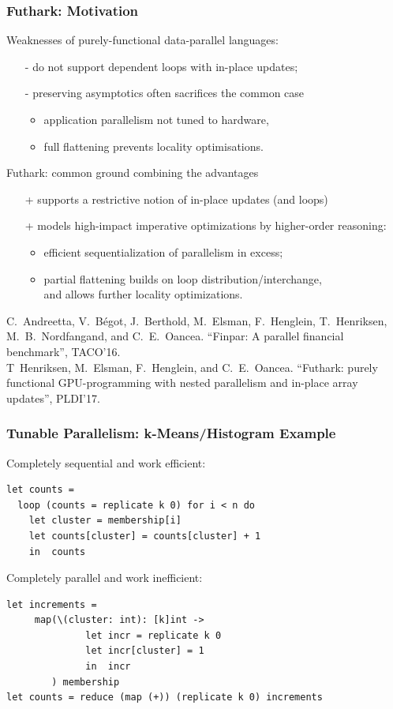 \documentclass{beamer}
\newcommand{\emp}[1]{\textcolor{DikuRed}{ #1}}
\newcommand{\emphh}[1]{\textcolor{CosGreen}{ #1}}
\begin{document}
\begin{frame}
  \frametitle{Futhark: Motivation}

\emp{Weaknesses of purely-functional data-parallel languages:}
\begin{itemize}
    \item[-] do not support dependent loops with in-place updates;
    \item[-] preserving asymptotics often sacrifices the common case 
        \begin{itemize}
            \item application parallelism not tuned to hardware,
            \item full flattening prevents locality optimisations.
        \end{itemize}
\end{itemize}
\bigskip

\emphh{Futhark: common ground combining the advantages}
\begin{itemize}
    \item[+] supports a restrictive notion of in-place updates (and loops)
    \item[+] models high-impact imperative optimizations by higher-order reasoning:
        \begin{itemize}
            \item efficient sequentialization of parallelism in excess;
            \item partial flattening builds on loop distribution/interchange,\\ 
                    and allows further locality optimizations.
        \end{itemize}
\end{itemize}
\medskip

\tiny{
C.~Andreetta, V.~Bégot, J.~Berthold, M.~Elsman, F.~Henglein, T.~Henriksen, M.~B.~Nordfangand, and C.~E.~Oancea. ``Finpar: A parallel financial benchmark'', TACO'16.\\
T~Henriksen, M.~Elsman, F.~Henglein, and C.~E.~Oancea. ``Futhark: purely functional GPU-programming with nested parallelism and in-place array updates'', PLDI'17.
}

\end{frame}


\begin{frame}[fragile,t]
  \frametitle{Tunable Parallelism: k-Means/Histogram Example}

\emp{Completely sequential} and \emphh{work efficient:}
\begin{lstlisting}
let counts = 
  loop (counts = replicate k 0) for i < n do
    let cluster = membership[i]
    let counts[cluster] = counts[cluster] + 1
    in  counts
\end{lstlisting}
\bigskip
\pause

\emphh{Completely parallel} and \emp{work inefficient:}
\begin{lstlisting}
let increments =
     map(\(cluster: int): [k]int ->
              let incr = replicate k 0
              let incr[cluster] = 1 
              in  incr
        ) membership
let counts = reduce (map (+)) (replicate k 0) increments
\end{lstlisting}
\end{frame}
\end{document}
